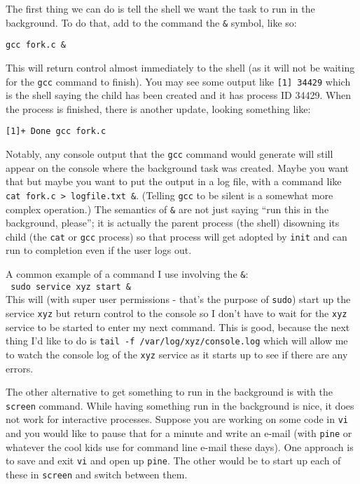 The first thing we can do is tell the shell we want the task to run in the background. To do that, add to the command the \texttt{\&} symbol, like so: 

\texttt{gcc fork.c \&}

This will return control almost immediately to the shell (as it will not be waiting for the \texttt{gcc} command to finish). You may see some output like \texttt{[1] 34429} which is the shell saying the child has been created and it has process ID 34429. When the process is finished, there is another update, looking something like:

\texttt{[1]+  Done                    gcc fork.c}

Notably, any console output that the \texttt{gcc} command would generate will still appear on the console where the background task was created. Maybe you want that but maybe you want to put the output in a log file, with a command like \texttt{cat fork.c > logfile.txt \&}. (Telling \texttt{gcc} to be silent is a somewhat more complex operation.) The semantics of \texttt{\&} are not just saying ``run this in the background, please''; it is actually the parent process (the shell) disowning its child (the \texttt{cat} or \texttt{gcc} process) so that process will get adopted by \texttt{init} and can run to completion even if the user logs out.

A common example of a command I use involving the \texttt{\&}:\\
\texttt{ sudo service xyz start \& }\\
This will (with super user permissions - that's the purpose of \texttt{sudo}) start up the service \texttt{xyz} but return control to the console so I don't have to wait for the \texttt{xyz} service to be started to enter my next command. This is good, because the next thing I'd like to do is \texttt{tail -f /var/log/xyz/console.log} which will allow me to watch the console log of the \texttt{xyz} service as it starts up to see if there are any errors.

The other alternative to get something to run in the background is with the \texttt{screen} command. While having something run in the background is nice, it does not work for interactive processes. Suppose you are working on some code in \texttt{vi} and you would like to pause that for a minute and write an e-mail (with \texttt{pine} or whatever the cool kids use for command line e-mail these days). One approach is to save and exit \texttt{vi} and open up \texttt{pine}. The other would be to start up each of these in \texttt{screen} and switch between them. 

